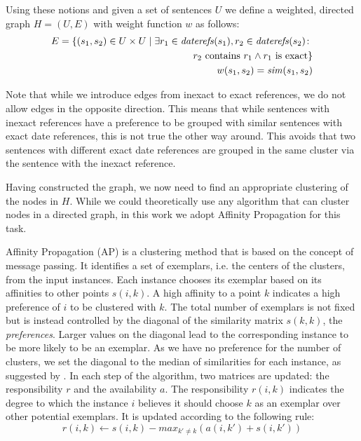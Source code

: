 \documentclass[a4paper,BCOR=10mm]{report}
\numberwithin{lemma}{chapter}
\numberwithin{definition}{chapter}
\begin{document}
Using these notions and given a set of sentences $U$ we define a weighted, directed graph $H = (U, E)$ with weight function $w$ as follows:
\begin{align}
E = \{ (s_1, s_2) \in U \times U \mid \exists r_1 \in \mathit{daterefs}(s_1), r_2 \in \mathit{daterefs}(s_2) \colon \notag\\ r_2 \text{ contains } r_1 \land r_1 \text{ is exact} \} \\ %
w(s_1, s_2) = \mathit{sim}(s_1, s_2)
\end{align}

Note that while we introduce edges from inexact to exact references, we do not allow edges in the opposite direction. This means that while sentences with inexact references have a preference to be grouped with similar sentences with exact date references, this is not true the other way around.
This avoids that two sentences with different exact date references are grouped in the same cluster via the sentence with the inexact reference.

Having constructed the graph, we now need to find an appropriate clustering of the nodes in $H$. While we could theoretically use any algorithm that can cluster nodes in a directed graph, in this work we adopt Affinity Propagation for this task.

Affinity Propagation (AP) \citep{ap} is a clustering method that is based on the concept of message passing. It identifies a set of exemplars, i.e. the centers of the clusters, from the input instances. Each instance chooses its exemplar based on its affinities to other points $s(i, k)$. A high affinity to a point $k$ indicates a high preference of $i$ to be clustered with $k$.
The total number of exemplars is not fixed but is instead controlled by the diagonal of the similarity matrix $s(k, k)$, the \textit{preferences}. Larger values on the diagonal lead to the corresponding instance to be more likely to be an exemplar.
As we have no preference for the number of clusters, we set the diagonal to the median of similarities for each instance, as suggested by \citeauthor{ap}.
In each step of the algorithm, two matrices are updated: the responsibility $r$ and the availability $a$. The responsibility $r(i, k)$ indicates the degree to which the instance $i$ believes it should choose $k$ as an exemplar over other potential exemplars. It is updated according to the following rule:
\begin{equation}
r(i, k) \leftarrow s(i, k) - max_{k' \neq k}( a(i, k') + s(i, k') )
\end{equation}
\end{document}
